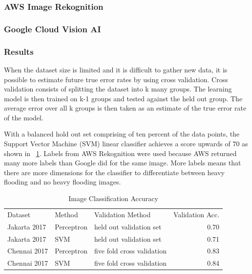 \subsubsection{AWS Image Rekognition}

\subsubsection{Google Cloud Vision AI}

\subsubsection{Results}
When the dataset size is limited and it is difficult to gather new data, 
it is possible to estimate future true error rates by using
cross validation. Cross validation consists of splitting the dataset into
k many groups. The learning model is then trained on k-1 groups and tested 
against the held out group. The average error over all k groups is then 
taken as an estimate of the true error rate of the model.

With a balanced hold out set comprising of ten percent of the
data points, the Support Vector Machine (SVM) linear classifier achieves a score
upwards of \.70 as shown in \tablename{}~\ref{chap4:imageSvmPerceptron}.
Labels from AWS Rekognition were used because AWS returned many more labels than 
Google did for the same image. More labels means that there are more dimensions
for the classifier to differentiate between heavy flooding and no heavy flooding
images.

\begin{table}[htbp]
\caption{Image Classification Accuracy}
\label{chap4:imageSvmPerceptron}
\begin{tabular}{lllr}
\toprule
      Dataset &      Method &           Validation Method &  Validation Acc. \\
 Jakarta 2017 &  Perceptron &     held out validation set &             0.70 \\
\midrule
 Jakarta 2017 &         SVM &     held out validation set &             0.71 \\
 Chennai 2017 &  Perceptron &  five fold cross validation &             0.83 \\
 Chennai 2017 &         SVM &  five fold cross validation &             0.84 \\
\bottomrule
\end{tabular}
\end{table}


